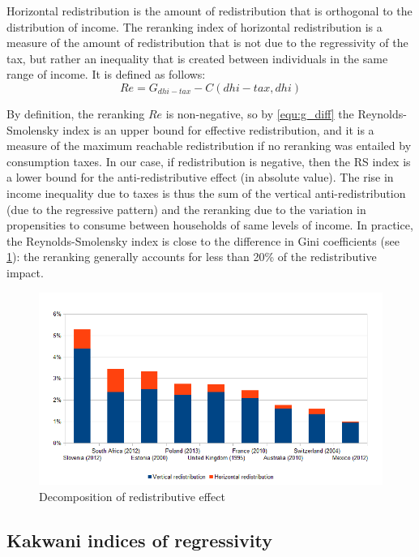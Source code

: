 Horizontal redistribution is the amount of redistribution that is orthogonal to the distribution of income. The reranking index of horizontal redistribution is a measure of the amount of redistribution that is not due to the regressivity of the tax, but rather an inequality that is created between individuals in the same range of income. It is defined as follows:
\[ Re = G_{dhi-tax} - C(dhi-tax,dhi) \]

By definition, the reranking $Re$ is non-negative, so by \cref{equ:g_diff} the Reynolds-Smolensky index is an upper bound for effective redistribution, and it is a measure of the maximum reachable redistribution if no reranking was entailed by consumption taxes. In our case, if redistribution is negative, then the RS index is a lower bound for the anti-redistributive effect (in absolute value). The rise in income inequality due to taxes is thus the sum of the vertical anti-redistribution (due to the regressive pattern) and the reranking due to the variation in propensities to consume between households of same levels of income. In practice, the Reynolds-Smolensky index is close to the difference in Gini coefficients (see \cref{fig:reranking}): the reranking generally accounts for less than 20\% of the redistributive impact. 

\begin{figure}
    \centering
    \includegraphics[width=\textwidth]{"images/19-02 decomposition effective redistribution"}
    \caption{Decomposition of redistributive effect}
    \label{fig:reranking}
\end{figure}


\subsection{Kakwani indices of regressivity}
\label{sec:kakwani}

